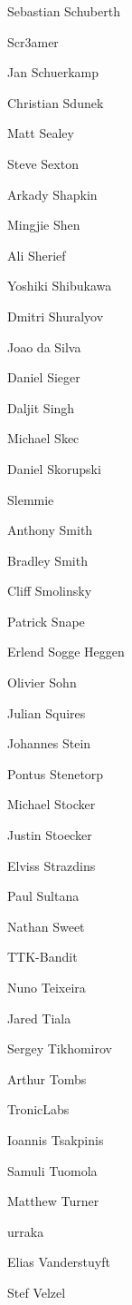 \begin{DoxyItemize}
\item Sebastian Schuberth
\item Scr3amer
\item Jan Schuerkamp
\item Christian Sdunek
\item Matt Sealey
\item Steve Sexton
\item Arkady Shapkin
\item Mingjie Shen
\item Ali Sherief
\item Yoshiki Shibukawa
\item Dmitri Shuralyov
\item Joao da Silva
\item Daniel Sieger
\item Daljit Singh
\item Michael Skec
\item Daniel Skorupski
\item Slemmie
\item Anthony Smith
\item Bradley Smith
\item Cliff Smolinsky
\item Patrick Snape
\item Erlend Sogge Heggen
\item Olivier Sohn
\item Julian Squires
\item Johannes Stein
\item Pontus Stenetorp
\item Michael Stocker
\item Justin Stoecker
\item Elviss Strazdins
\item Paul Sultana
\item Nathan Sweet
\item TTK-\/\+Bandit
\item Nuno Teixeira
\item Jared Tiala
\item Sergey Tikhomirov
\item Arthur Tombs
\item Tronic\+Labs
\item Ioannis Tsakpinis
\item Samuli Tuomola
\item Matthew Turner
\item urraka
\item Elias Vanderstuyft
\item Stef Velzel

\end{DoxyItemize}
